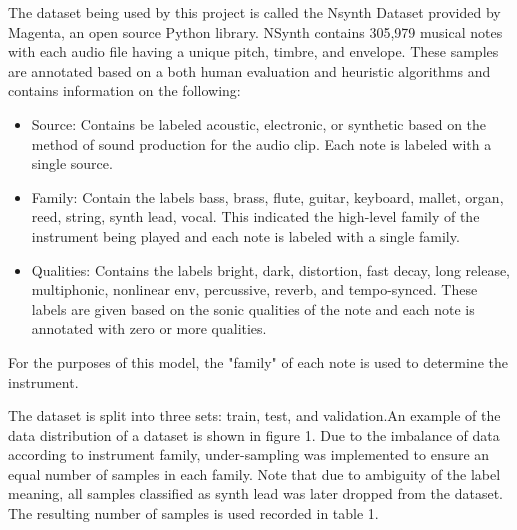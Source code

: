 \documentclass{article}
\begin{document}
The dataset being used by this project is called the Nsynth Dataset provided by Magenta, an open source Python library. NSynth contains 305,979 musical notes with each audio file having a unique pitch, timbre, and envelope. These samples are annotated based on a both human evaluation and heuristic algorithms and contains information on the following:

\begin{itemize}
\item Source: Contains be labeled acoustic, electronic, or synthetic based on the method of sound production for the audio clip. Each note is labeled with a single source.
\item Family: Contain the labels bass, brass, flute, guitar, keyboard, mallet, organ, reed, string, synth lead, vocal. This indicated the high-level family of the instrument being played and each note is labeled with a single family. 
\item Qualities: Contains the labels bright, dark, distortion, fast decay, long release, multiphonic, nonlinear env, percussive, reverb, and tempo-synced. These labels are given based on the sonic qualities of the note and each note is annotated with zero or more qualities.
\end{itemize}

For the purposes of this model, the "family" of each note is used to determine the instrument.

The dataset is split into three sets: train, test, and validation.An example of the data distribution of a dataset is shown in figure 1. Due to the imbalance of data according to instrument family, under-sampling was implemented to ensure an equal number of samples in each family. Note that due to ambiguity of the label meaning, all samples classified as synth lead was later dropped from the dataset. The resulting number of samples is used recorded in table 1.
\end{document}

